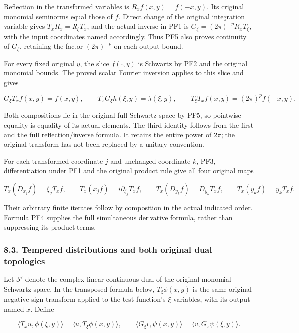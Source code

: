 \documentclass[
  11pt,
]{article}
\begin{document}
Reflection in the transformed variables is \(R_xf(x,y)=f(-x,y)\). Its
original monomial seminorms equal those of \(f\). Direct change of the
original integration variable gives \(T_xR_x=R_\xi T_x\), and the actual
inverse in PF1 is \(G_\xi=(2\pi)^{-p}R_xT_\xi\), with the input
coordinates named accordingly. Thus PF5 also proves continuity of
\(G_\xi\), retaining the factor \((2\pi)^{-p}\) on each output bound.

For every fixed original \(y\), the slice \(f(\cdot,y)\) is Schwartz by
PF2 and the original monomial bounds. The proved scalar Fourier
inversion applies to this slice and gives

\[
 G_\xi T_x f(x,y)=f(x,y),\qquad
 T_xG_\xi h(\xi,y)=h(\xi,y),\qquad
 T_\xi T_x f(x,y)=(2\pi)^p f(-x,y).
 \tag{PF6}
\]

Both compositions lie in the original full Schwartz space by PF5, so
pointwise equality is equality of its actual elements. The third
identity follows from the first and the full reflection/inverse formula.
It retains the entire power of \(2\pi\); the original transform has not
been replaced by a unitary convention.

For each transformed coordinate \(j\) and unchanged coordinate \(k\),
PF3, differentiation under PF1 and the original product rule give all
four original maps

\[
 T_x(D_{x_j}f)=\xi_jT_xf,\qquad
 T_x(x_jf)=i\partial_{\xi_j}T_xf,\qquad
 T_x(D_{y_k}f)=D_{y_k}T_xf,\qquad
 T_x(y_kf)=y_kT_xf.
 \tag{PF7}
\]

Their arbitrary finite iterates follow by composition in the actual
indicated order. Formula PF4 supplies the full simultaneous derivative
formula, rather than suppressing its product terms.

\subsubsection{8.3. Tempered distributions and both original dual
topologies}\label{tempered-distributions-and-both-original-dual-topologies}

Let \(\mathcal S'\) denote the complex-linear continuous dual of the
original monomial Schwartz space. In the transposed formula below,
\(T_\xi\phi(x,y)\) is the same original negative-sign transform applied
to the test function's \(\xi\) variables, with its output named \(x\).
Define

\[
 \langle T_xu,\phi(\xi,y)\rangle
       =\langle u,T_\xi\phi(x,y)\rangle,
 \qquad
 \langle G_\xi v,\psi(x,y)\rangle
       =\langle v,G_x\psi(\xi,y)\rangle.
 \tag{PF8}
\]
\end{document}
